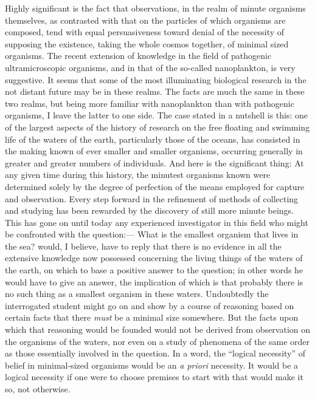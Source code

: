 \documentclass[a4paper, 11pt, oneside, polutonikogreek, english]{article}
\begin{document}
Highly significant is the fact that observations, in the realm of minute organisms themselves, as contrasted with that on the particles of which organisms are composed, tend with equal persuasiveness toward denial of the necessity of supposing the existence, taking the whole cosmos together, of minimal sized organisms. The recent extension of knowledge in the field of pathogenic ultramicroscopic organisms, and in that of the so-called nanoplankton, is very suggestive. It seems that some of the most illuminating biological research in the not distant future may be in these realms. The facts are much the same in these two realms, but being more familiar with nanoplankton than with pathogenic organisms, I leave the latter to one side. The case stated in a nutshell is this: one of the largest aspects of the history of research on the free floating and swimming life of the waters of the earth, particularly those of the oceans, has consisted in the making known of ever smaller and smaller organisms, occurring generally in greater and greater numbers of individuals. And here is the significant thing: At any given time during this history, the minutest organisms known were determined solely by the degree of perfection of the means employed for capture and observation. Every step forward in the refinement of methods of collecting and studying has been rewarded by the discovery of still more minute beings. This has gone on until today any experienced investigator in this field who might be confronted with the question:--- What is the smallest organism that lives in the sea? would, I believe, have to reply that there is no evidence in all the extensive knowledge now possessed concerning the living things of the waters of the earth, on which to base a positive answer to the question; in other words he would have to give an answer, the implication of which is that probably there is no such thing as a smallest organism in these waters. Undoubtedly the interrogated student might go on and show by a course of reasoning based on certain facts that there \emph{must} be a minimal size somewhere. But the facts upon which that reasoning would be founded would not be derived from observation on the organisms of the waters, nor even on a study of phenomena of the same order as those essentially involved in the question. In a word, the ``logical necessity'' of belief in minimal-sized organisms would be an \emph{a priori} necessity. It would be a logical necessity if one were to choose premises to start with that would make it so, not otherwise.
\end{document}
